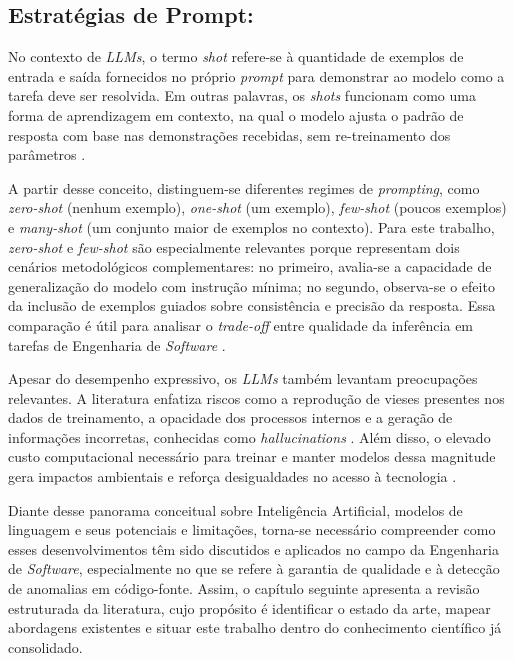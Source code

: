 \subsection{Estratégias de Prompt:}

No contexto de \textit{LLMs}, o termo \textit{shot} refere-se à quantidade de exemplos de entrada e saída fornecidos no próprio \textit{prompt} para demonstrar ao modelo como a tarefa deve ser resolvida. Em outras palavras, os \textit{shots} funcionam como uma forma de aprendizagem em contexto, na qual o modelo ajusta o padrão de resposta com base nas demonstrações recebidas, sem re-treinamento dos parâmetros \cite{Babikian2025StringValues}.

A partir desse conceito, distinguem-se diferentes regimes de \textit{prompting}, como \textit{zero-shot} (nenhum exemplo), \textit{one-shot} (um exemplo), \textit{few-shot} (poucos exemplos) e \textit{many-shot} (um conjunto maior de exemplos no contexto). Para este trabalho, \textit{zero-shot} e \textit{few-shot} são especialmente relevantes porque representam dois cenários metodológicos complementares: no primeiro, avalia-se a capacidade de generalização do modelo com instrução mínima; no segundo, observa-se o efeito da inclusão de exemplos guiados sobre consistência e precisão da resposta. Essa comparação é útil para analisar o \textit{trade-off} entre qualidade da inferência em tarefas de Engenharia de \textit{Software} \cite{Bommasani2021,Abtahi2025LLMStaticAnalysis,Babikian2025StringValues}.

Apesar do desempenho expressivo, os \textit{LLMs} também levantam preocupações relevantes. A literatura enfatiza riscos como a 
reprodução de vieses presentes nos dados de treinamento, a opacidade dos processos internos e a geração de informações 
incorretas, conhecidas como \textit{hallucinations} \cite{Bender2021}. Além disso, o elevado custo computacional 
necessário para treinar e manter modelos dessa magnitude gera impactos ambientais e reforça desigualdades no acesso à 
tecnologia \cite{Strubell2020}.

Diante desse panorama conceitual sobre Inteligência Artificial, modelos de linguagem e seus potenciais e limitações, 
torna-se necessário compreender como esses desenvolvimentos têm sido discutidos e aplicados no campo da Engenharia de 
\textit{Software}, especialmente no que se refere à garantia de qualidade e à detecção de anomalias em código-fonte. Assim, o 
capítulo seguinte apresenta a revisão estruturada da literatura, cujo propósito é identificar o estado da arte, mapear 
abordagens existentes e situar este trabalho dentro do conhecimento científico já consolidado.





